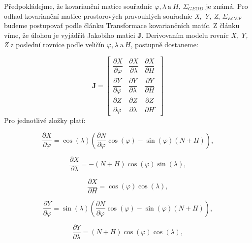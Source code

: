 Předpokládejme, že kovarianční matice souřadníc $\varphi, \lambda\ \text{a}\ H$, $\Sigma_{GEOD}$ je známá. Pro odhad kovarianční matice prostorových pravouhlých souřadníc \textit{X, Y, Z}, $\Sigma_{ECEF}$ budeme postupovať podle článku Transformace kovariančních matíc. Z článku víme, že úlohou je vyjádřít Jakobiho matici $\textbf{J}$. Derivovaním modelu rovníc \textit{X, Y, Z} z poslední rovníce podle veličín $\varphi, \lambda\ \text{a}\ H$, postupně dostaneme:

\begin{equation}
\mathbf{J} = 
\begin{bmatrix}
\dfrac{\partial X}{\partial \varphi} & \dfrac{\partial X}{\partial \lambda} & \dfrac{\partial X}{\partial H} \\
\dfrac{\partial Y}{\partial \varphi} & \dfrac{\partial Y}{\partial \lambda} & \dfrac{\partial Y}{\partial H} \\
\dfrac{\partial Z}{\partial \varphi} & \dfrac{\partial Z}{\partial \lambda} & \dfrac{\partial Z}{\partial H}.
\end{bmatrix}
\end{equation}
Pro jednotlivé zložky platí:

\begin{equation}
\dfrac{\partial X}{\partial \varphi} = \cos{\left(\lambda\right)}\left(\dfrac{\partial N}{\partial \varphi}\cos{\left(\varphi\right)}-\sin{\left(\varphi\right)}\left(N + H\right)\right),
\end{equation}

\begin{equation}
\dfrac{\partial X}{\partial \lambda} = -\left(N+H\right)\cos{\left(\varphi\right)}\sin{\left(\lambda\right)},
\end{equation}

\begin{equation}
\dfrac{\partial X}{\partial H} = \cos{\left(\varphi\right)}\cos{\left(\lambda\right)},
\end{equation}

\begin{equation}
\dfrac{\partial Y}{\partial \varphi} = \sin{\left(\lambda\right)}\left(\dfrac{\partial N}{\partial \varphi} \cos{\left(\varphi\right)} - \sin{\left(\varphi\right)}\left(N + H\right)\right),
\end{equation}

\begin{equation}
\dfrac{\partial Y}{\partial \lambda} = \left(N+H\right)\cos{\left(\varphi \right)}\cos{\left(\lambda \right)},
\end{equation}

